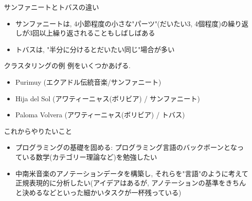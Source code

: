\documentclass[dvipdfmx,11pt]{beamer}
\theoremstyle{definition}
\begin{document}
\begin{frame}{サンファニートとトバスの違い}
\begin{itemize}
\item サンファニートは, 4小節程度の小さな"パーツ"(だいたい3, 4個程度)の繰り返しが3回以上繰り返されることもしばしばある
\item トバスは, "半分に分けるとだいたい同じ"場合が多い
\end{itemize}
\end{frame}

\begin{frame}{クラスタリングの例}
例をいくつかあげる.
\begin{itemize}
\item Purimuy (エクアドル伝統音楽/サンファニート)
\item Hija del Sol (アワティーニャス(ボリビア) / サンファニート)
\item Paloma Volvera (アワティーニャス(ボリビア) / トバス)
\end{itemize}
\end{frame}

\begin{frame}{これからやりたいこと}
\begin{itemize}
\item プログラミングの基礎を固める: プログラミング言語のバックボーンとなっている数学(カテゴリー理論など)を勉強したい
\item 中南米音楽のアノテーションデータを構築し, それらを"言語"のように考えて正規表現的に分析したい(アイデアはあるが, アノテーションの基準をきちんと決めるなどといった細かいタスクが一杯残っている)
\end{itemize}
\end{frame}
\end{document}
